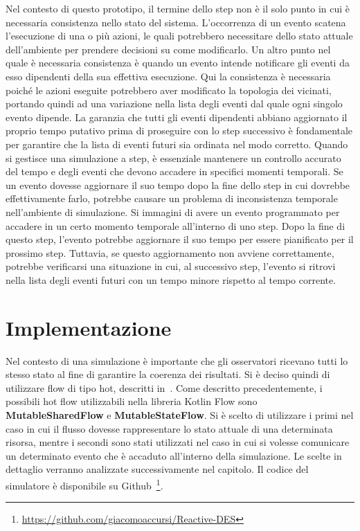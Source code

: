 \documentclass[12pt,a4paper,openright,twoside]{book}
\begin{document}
Nel contesto di questo prototipo, il termine dello step non è il solo punto in cui è necessaria consistenza nello stato del sistema. L'occorrenza di un evento scatena l'esecuzione di una o più azioni, le quali potrebbero necessitare dello stato attuale dell'ambiente per prendere decisioni su come modificarlo. 
Un altro punto nel quale è necessaria consistenza è quando un evento intende notificare gli eventi da esso dipendenti della sua effettiva esecuzione. Qui la consistenza è necessaria poiché le azioni eseguite potrebbero aver modificato la topologia dei vicinati, portando quindi ad una variazione nella lista degli eventi dal quale ogni singolo evento dipende. 
La garanzia che tutti gli eventi dipendenti abbiano aggiornato il proprio tempo putativo prima di proseguire con lo step successivo è fondamentale per garantire che la lista di eventi futuri sia ordinata nel modo corretto. Quando si gestisce una simulazione a step, è essenziale mantenere un controllo accurato del tempo e degli eventi che devono accadere in specifici momenti temporali. Se un evento dovesse aggiornare il suo tempo dopo la fine dello step in cui dovrebbe effettivamente farlo, potrebbe causare un problema di inconsistenza temporale nell'ambiente di simulazione.
Si immagini di avere un evento programmato per accadere in un certo momento temporale all'interno di uno step. Dopo la fine di questo step, l'evento potrebbe aggiornare il suo tempo per essere pianificato per il prossimo step. Tuttavia, se questo aggiornamento non avviene correttamente, potrebbe verificarsi una situazione in cui, al successivo step, l'evento si ritrovi nella lista degli eventi futuri con un tempo minore rispetto al tempo corrente.

\section{Implementazione}
Nel contesto di una simulazione è importante che gli osservatori ricevano tutti lo stesso stato al fine di garantire la coerenza dei risultati. Si è deciso quindi di utilizzare flow di tipo hot, descritti in~. 
Come descritto precedentemente, i possibili hot flow utilizzabili nella libreria Kotlin Flow sono \textbf{MutableSharedFlow} e \textbf{MutableStateFlow}. Si è scelto di utilizzare i primi nel caso in cui il flusso dovesse rappresentare lo stato attuale di una determinata risorsa, mentre i secondi sono stati utilizzati nel caso in cui si volesse comunicare un determinato evento che è accaduto all'interno della simulazione. Le scelte in dettaglio verranno analizzate successivamente nel capitolo. 
Il codice del simulatore è disponibile su Github~\footnote{\url{https://github.com/giacomoaccursi/Reactive-DES}}.
\end{document}
